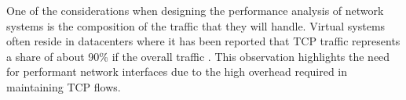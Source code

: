 One of the considerations when designing the performance analysis of network systems is the composition of the traffic that they will handle.  
Virtual systems often reside in datacenters where it has been reported that TCP traffic represents a share of about 90\% if the overall traffic \autocite{haTCPCloud2013}.
This observation highlights the need for performant network interfaces due to the high overhead required in maintaining TCP flows.



\nocite{_dpdk_1, _adams_1, _chowdhury_1, _perry_1, _grinberg_1, rathore2013kvm, seo2014performance, gomes2014performance, kivity2014osv, wang2011understanding}

